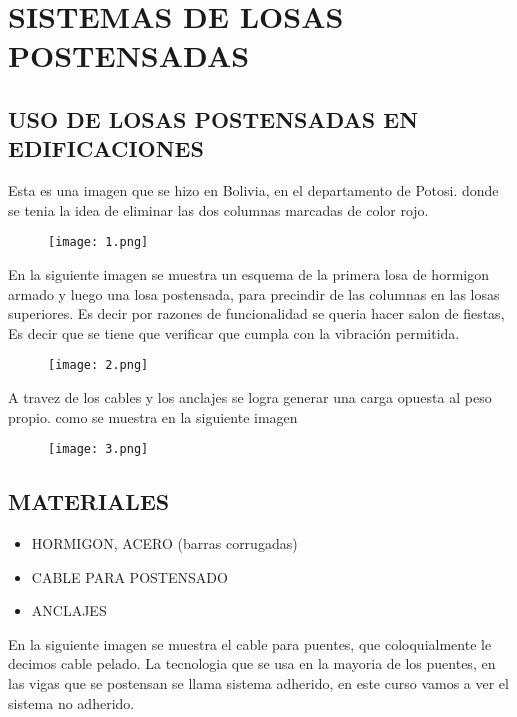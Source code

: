 

\chapter{SISTEMAS DE LOSAS POSTENSADAS}
\newpage

\section{USO DE LOSAS POSTENSADAS EN EDIFICACIONES}

Esta es una imagen que se hizo en Bolivia, en el departamento de
Potosi. donde se tenia la idea de eliminar las dos columnas marcadas
de color rojo.

\begin{figure}[H]
\centering
\texttt{[image: 1.png]}
\end{figure}

En la siguiente imagen se muestra un esquema de la primera losa 
de hormigon armado y luego una losa postensada, para precindir 
de las columnas en las losas superiores. Es decir por razones
de funcionalidad se queria hacer salon de fiestas, Es decir que
se tiene que verificar que cumpla con la vibración permitida.

\begin{figure}[H]
\centering
\texttt{[image: 2.png]}
\end{figure}

A travez de los cables y los anclajes se logra generar una carga
opuesta al peso propio. como se muestra en la siguiente imagen

\begin{figure}[H]
\centering
\texttt{[image: 3.png]}
\end{figure}

\section{MATERIALES}

\begin{itemize}
	\item HORMIGON, ACERO (barras corrugadas)
	\item CABLE PARA POSTENSADO
	\item ANCLAJES
\end{itemize}

En la siguiente imagen se muestra el cable para puentes, que coloquialmente
le decimos cable pelado. La tecnologia que se usa en la mayoria de los puentes,
en las vigas que se postensan se llama \textquotedbl sistema adherido\textquotedbl,
en este curso vamos a ver el \textquotedbl sistema no adherido\textquotedbl.

